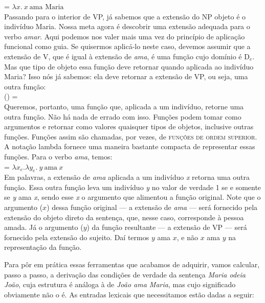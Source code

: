 \n {} = $\lambda x.\ x\ \text{ama Maria}$\\

\n Passando para o interior de VP, já sabemos que a extensão do NP
objeto é o indivíduo Maria. Nossa meta agora é descobrir uma
extensão adequada para o verbo \textit{amar}. Aqui podemos nos valer mais
uma vez do princípio de aplicação funcional como guia. Se
quisermos aplicá-lo neste caso, devemos assumir que a extensão de
V, que é igual à extensão de \textit{ama}, é uma função cujo domínio é
D$_{e}$. Mas que tipo de objeto essa função deve retornar quando
aplicada ao indivíduo Maria? Isso nós já sabemos: ela deve
retornar a extensão de VP, ou seja, uma outra função:\\

\noindent {}() = \\

\noindent Queremos, portanto, uma função que, aplicada a um indivíduo, retorne uma outra função. Não há nada de errado com isso. Funções podem tomar como argumentos e retornar como valores quaisquer tipos de objetos, inclusive outras funções. Funções assim são chamadas, por vezes, de \textsc{funções de ordem superior}. A notação lambda fornece uma maneira bastante compacta de representar essas funções. Para o verbo \textit{ama}, temos:\\

\noindent {} = $\lambda x_{e}.\lambda y_{e}.\ y\ \text{ama}\ x$\\

\noindent Em palavras, a extensão de \textit{ama} aplicada a um indivíduo
\textit{x} retorna uma outra função. Essa outra função leva um indivíduo \textit{y}
no valor de verdade 1 se e somente se \textit{y} ama \textit{x}, sendo esse \textit{x} o argumento que alimentou a função original. Note que o argumento ($x$) dessa função original --- a extensão de \textit{ama} --- será fornecido pela extensão do objeto direto da sentença, que, nesse caso, corresponde à pessoa amada. Já o argumento ($y$) da função resultante --- a extensão de VP --- será fornecido pela extensão do sujeito. Daí termos $y$ ama $x$, e não $x$ ama $y$ na representação da função.

Para pôr em prática essas ferramentas que acabamos de adquirir, vamos
calcular, passo a passo, a derivação das condições de
verdade da sentença \textit{Maria odeia João}, cuja estrutura é análoga
à de \textit{João ama Maria}, mas cujo significado obviamente não o é.
As entradas lexicais que necessitamos estão dadas a seguir:\\

